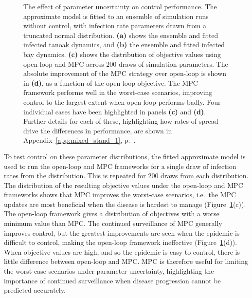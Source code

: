 \begin{figure}[t]
    \begin{center}
        \caption[Effect of parameter uncertainty on control performance]{The effect of parameter uncertainty on control performance. The approximate model is fitted to an ensemble of simulation runs without control, with infection rate parameters drawn from a truncated normal distribution. \textbf{(a)} shows the ensemble and fitted infected tanoak dynamics, and \textbf{(b)} the ensemble and fitted infected bay dynamics. \textbf{(c)} shows the distribution of objective values using open-loop and MPC across 200 draws of simulation parameters. The absolute improvement of the MPC strategy over open-loop is shown in \textbf{(d)}, as a function of the open-loop objective. The MPC framework performs well in the worst-case scenarios, improving control to the largest extent when open-loop performs badly. Four individual cases have been highlighted in panels \textbf{(c)} and \textbf{(d)}. Further details for each of these, highlighting how rates of spread drive the differences in performance, are shown in Appendix~\ref{app:mixed_stand_1}, p.~\pageref{app:mixed_stand_1}.\label{fig:ch6:param_uncert}}
    \end{center}
\end{figure}

To test control on these parameter distributions, the fitted approximate model is used to run the open-loop and MPC frameworks for a single draw of infection rates from the distribution. This is repeated for 200 draws from each distribution. The distribution of the resulting objective values under the open-loop and MPC frameworks shows that MPC improves the worst-case scenarios, i.e.\ the MPC updates are most beneficial when the disease is hardest to manage (Figure~\ref{fig:ch6:param_uncert}(c)). The open-loop framework gives a distribution of objectives with a worse minimum value than MPC. The continued surveillance of MPC generally improves control, but the greatest improvements are seen when the epidemic is difficult to control, making the open-loop framework ineffective (Figure~\ref{fig:ch6:param_uncert}(d)). When objective values are high, and so the epidemic is easy to control, there is little difference between open-loop and MPC. MPC is therefore useful for limiting the worst-case scenarios under parameter uncertainty, highlighting the importance of continued surveillance when disease progression cannot be predicted accurately.

